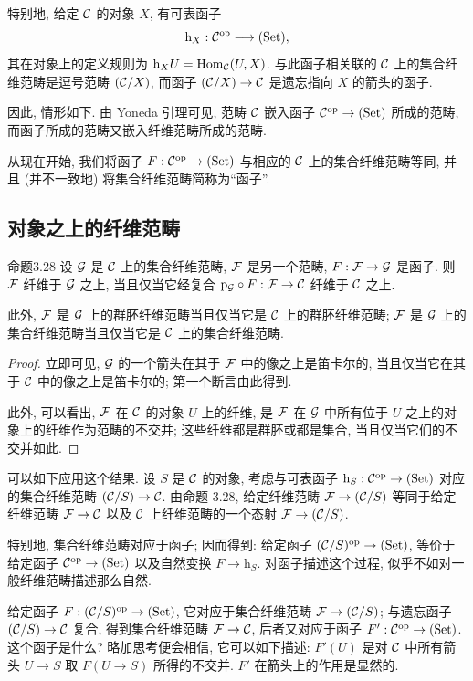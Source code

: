 特别地, 给定 $\mathcal C$ 的对象 $X$, 有可表函子
\[
\mathrm h_X:\mathcal C^{\mathrm{op}}\longrightarrow(\mathrm{Set}),
\]
其在对象上的定义规则为 $\mathrm h_XU=\operatorname{Hom}_{\mathcal C}(U,X)$. 与此函子相关联的 $\mathcal C$ 上的集合纤维范畴是逗号范畴 $(\mathcal C/X)$, 而函子 $(\mathcal C/X)\to\mathcal C$ 是遗忘指向 $X$ 的箭头的函子.

因此, 情形如下. 由 Yoneda 引理可见, 范畴 $\mathcal C$ 嵌入函子 $\mathcal C^{\mathrm{op}}\to(\mathrm{Set})$ 所成的范畴, 而函子所成的范畴又嵌入纤维范畴所成的范畴.

从现在开始, 我们将函子 $F:\mathcal C^{\mathrm{op}}\to(\mathrm{Set})$ 与相应的 $\mathcal C$ 上的集合纤维范畴等同, 并且 (并不一致地) 将集合纤维范畴简称为“函子”.

\subsection{对象之上的纤维范畴}
\begin{origstatement}{命题}{3.28}\label{ch03:prop328}
设 $\mathcal G$ 是 $\mathcal C$ 上的集合纤维范畴, $\mathcal F$ 是另一个范畴, $F:\mathcal F\to\mathcal G$ 是函子. 则 $\mathcal F$ 纤维于 $\mathcal G$ 之上, 当且仅当它经复合 $\mathrm p_{\mathcal G}\circ F:\mathcal F\to\mathcal C$ 纤维于 $\mathcal C$ 之上.

此外, $\mathcal F$ 是 $\mathcal G$ 上的群胚纤维范畴当且仅当它是 $\mathcal C$ 上的群胚纤维范畴; $\mathcal F$ 是 $\mathcal G$ 上的集合纤维范畴当且仅当它是 $\mathcal C$ 上的集合纤维范畴.
\end{origstatement}
\begin{proof}
立即可见, $\mathcal G$ 的一个箭头在其于 $\mathcal F$ 中的像之上是笛卡尔的, 当且仅当它在其于 $\mathcal C$ 中的像之上是笛卡尔的; 第一个断言由此得到.

此外, 可以看出, $\mathcal F$ 在 $\mathcal C$ 的对象 $U$ 上的纤维, 是 $\mathcal F$ 在 $\mathcal G$ 中所有位于 $U$ 之上的对象上的纤维作为范畴的不交并; 这些纤维都是群胚或都是集合, 当且仅当它们的不交并如此.
\end{proof}

可以如下应用这个结果. 设 $S$ 是 $\mathcal C$ 的对象, 考虑与可表函子 $\mathrm h_S:\mathcal C^{\mathrm{op}}\to(\mathrm{Set})$ 对应的集合纤维范畴 $(\mathcal C/S)\to\mathcal C$. 由命题 3.28, 给定纤维范畴 $\mathcal F\to(\mathcal C/S)$ 等同于给定纤维范畴 $\mathcal F\to\mathcal C$ 以及 $\mathcal C$ 上纤维范畴的一个态射 $\mathcal F\to(\mathcal C/S)$.

特别地, 集合纤维范畴对应于函子; 因而得到: 给定函子 $(\mathcal C/S)^{\mathrm{op}}\to(\mathrm{Set})$, 等价于给定函子 $\mathcal C^{\mathrm{op}}\to(\mathrm{Set})$ 以及自然变换 $F\to\mathrm h_S$. 对函子描述这个过程, 似乎不如对一般纤维范畴描述那么自然.

给定函子 $F:(\mathcal C/S)^{\mathrm{op}}\to(\mathrm{Set})$, 它对应于集合纤维范畴 $\mathcal F\to(\mathcal C/S)$; 与遗忘函子 $(\mathcal C/S)\to\mathcal C$ 复合, 得到集合纤维范畴 $\mathcal F\to\mathcal C$, 后者又对应于函子 $F':\mathcal C^{\mathrm{op}}\to(\mathrm{Set})$. 这个函子是什么? 略加思考便会相信, 它可以如下描述: $F'(U)$ 是对 $\mathcal C$ 中所有箭头 $U\to S$ 取 $F(U\to S)$ 所得的不交并. $F'$ 在箭头上的作用是显然的.

